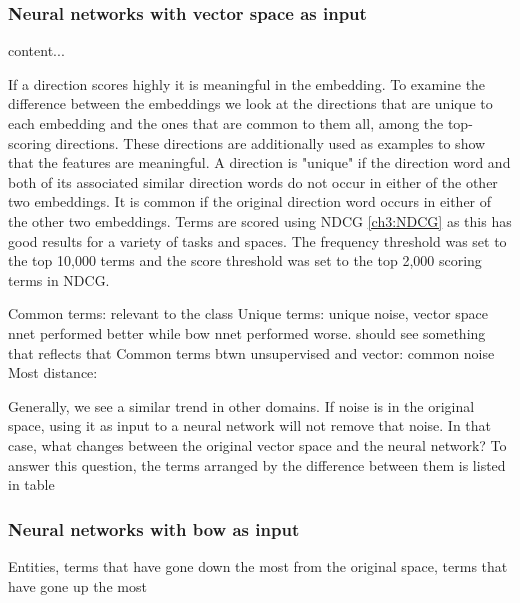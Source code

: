 \subsubsection{Neural networks with vector space as input}


\begin{table}[]\label{Top-scoring unique and common terms}
	content...
\end{table}

 If a direction scores highly it is meaningful in the embedding. To examine the difference between the embeddings we look at the directions that are unique to each embedding and the ones that are common to them all, among the top-scoring directions. These directions are additionally used as examples to show that the features are meaningful. A direction is "unique" if the direction word and both of its associated similar direction words do not occur in either of the other two embeddings. It is common if the original direction word occurs in either of the other two embeddings. Terms are scored using NDCG \ref{ch3:NDCG} as this has good results for a variety of tasks and spaces. The frequency threshold was set to the top 10,000 terms and the score threshold was set to the top 2,000 scoring terms in NDCG. 



Common terms: relevant to the class
Unique terms: unique noise, vector space nnet performed better while bow nnet performed worse. should see something that reflects that
Common terms btwn unsupervised and vector: common noise
Most distance: 

Generally, we see a similar trend in other domains. If noise is in the original space, using it as input to a neural network will not remove that noise. In that case, what changes between the original vector space and the neural network? To answer this question, the terms arranged by the difference between them is listed in table 



\subsubsection{Neural networks with bow as input}




\begin{table}[]\label{Unique word directions identified in the bow representation}
	Entities, terms that have gone down the most from the original space, terms that have gone up the most
\end{table}

